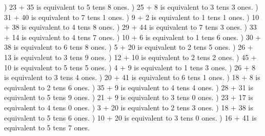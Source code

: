\documentclass{article}%
\begin{document}
) 23 + 35 is equivalent to 5 tens 8 ones.%
) 25 + 8 is equivalent to 3 tens 3 ones.%
) 31 + 40 is equivalent to 7 tens 1 ones.%
) 9 + 2 is equivalent to 1 tens 1 ones.%
) 10 + 38 is equivalent to 4 tens 8 ones.%
) 29 + 44 is equivalent to 7 tens 3 ones.%
) 33 + 14 is equivalent to 4 tens 7 ones.%
) 10 + 6 is equivalent to 1 tens 6 ones.%
) 30 + 38 is equivalent to 6 tens 8 ones.%
) 5 + 20 is equivalent to 2 tens 5 ones.%
) 26 + 13 is equivalent to 3 tens 9 ones.%
) 12 + 10 is equivalent to 2 tens 2 ones.%
) 45 + 10 is equivalent to 5 tens 5 ones.%
) 4 + 9 is equivalent to 1 tens 3 ones.%
) 26 + 8 is equivalent to 3 tens 4 ones.%
) 20 + 41 is equivalent to 6 tens 1 ones.%
) 18 + 8 is equivalent to 2 tens 6 ones.%
) 35 + 9 is equivalent to 4 tens 4 ones.%
) 28 + 31 is equivalent to 5 tens 9 ones.%
) 21 + 9 is equivalent to 3 tens 0 ones.%
) 23 + 17 is equivalent to 4 tens 0 ones.%
) 3 + 20 is equivalent to 2 tens 3 ones.%
) 18 + 38 is equivalent to 5 tens 6 ones.%
) 10 + 20 is equivalent to 3 tens 0 ones.%
) 16 + 41 is equivalent to 5 tens 7 ones.%
\newline%
\newpage%
\end{document}
